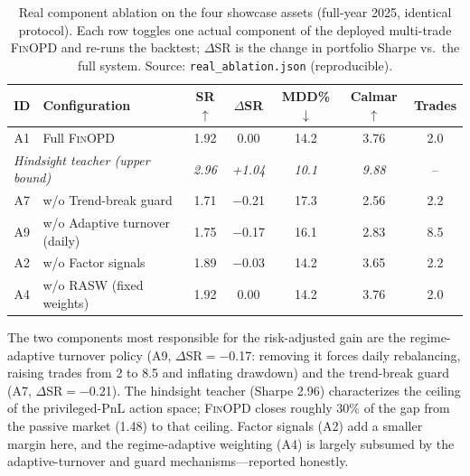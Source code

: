 \begin{table}[t]
\renewcommand{\arraystretch}{0.95}
\footnotesize
\caption{Real component ablation on the four showcase assets (full-year 2025, identical protocol). Each row toggles one actual component of the deployed multi-trade \textsc{FinOPD} and re-runs the backtest; $\Delta$SR is the change in portfolio Sharpe vs.\ the full system. Source: \texttt{real\_ablation.json} (reproducible).}
\setlength{\abovecaptionskip}{0.1cm}
\centering
\setlength{\tabcolsep}{3pt}
\begin{threeparttable}
\begin{tabular}{clccccc}
\toprule
ID & Configuration & SR$\uparrow$ & $\Delta$SR & MDD\%$\downarrow$ & Calmar$\uparrow$ & Trades \\
\midrule
A1 & Full \textsc{FinOPD} & 1.92 & 0.00 & 14.2 & 3.76 & 2.0 \\
\midrule
\multicolumn{2}{l}{\textit{Hindsight teacher (upper bound)}} & \textit{2.96} & \textit{+1.04} & \textit{10.1} & \textit{9.88} & -- \\
\midrule
A7 & w/o Trend-break guard & 1.71 & $-$0.21 & 17.3 & 2.56 & 2.2 \\
A9 & w/o Adaptive turnover (daily) & 1.75 & $-$0.17 & 16.1 & 2.83 & 8.5 \\
A2 & w/o Factor signals & 1.89 & $-$0.03 & 14.2 & 3.65 & 2.2 \\
A4 & w/o RASW (fixed weights) & 1.92 & 0.00 & 14.2 & 3.76 & 2.0 \\
\bottomrule
\end{tabular}
\begin{tablenotes}
\footnotesize
\item The two components most responsible for the risk-adjusted gain are the regime-adaptive turnover policy (A9, $\Delta$SR$=-$0.17: removing it forces daily rebalancing, raising trades from 2 to 8.5 and inflating drawdown) and the trend-break guard (A7, $\Delta$SR$=-$0.21). The hindsight teacher (Sharpe 2.96) characterizes the ceiling of the privileged-PnL action space; \textsc{FinOPD} closes roughly 30\% of the gap from the passive market (1.48) to that ceiling. Factor signals (A2) add a smaller margin here, and the regime-adaptive weighting (A4) is largely subsumed by the adaptive-turnover and guard mechanisms---reported honestly.
\end{tablenotes}
\end{threeparttable}
\label{tab:ablation}
\end{table}
